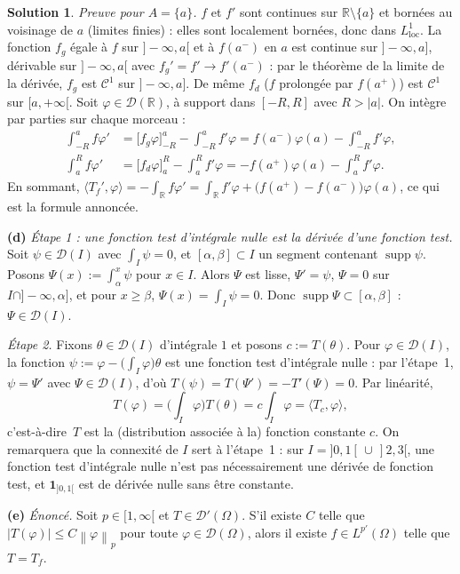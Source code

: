 \documentclass[11pt,a4paper]{article}
\newcommand{\R}{\mathbb{R}}
\newcommand{\norm}[1]{\left\|#1\right\|}
\newcommand{\ie}{c'est-à-dire}
\DeclareMathOperator{\supp}{supp}
\newcommand{\D}{\mathcal{D}}
\theoremstyle{definition}
\newtheorem*{solution}{Solution}
\begin{document}
\begin{solution}
\emph{Preuve pour $A=\{a\}$.} $f$ et $f'$ sont continues sur $\R\setminus\{a\}$ et bornées au voisinage de $a$ (limites finies) : elles sont localement bornées, donc dans $L^1_{\mathrm{loc}}$. La fonction $f_g$ égale à $f$ sur $]-\infty,a[$ et à $f(a^-)$ en $a$ est continue sur $]-\infty,a]$, dérivable sur $]-\infty,a[$ avec $f_g'=f'\to f'(a^-)$ : par le théorème de la limite de la dérivée, $f_g$ est $\mathcal C^1$ sur $]-\infty,a]$. De même $f_d$ ($f$ prolongée par $f(a^+)$) est $\mathcal C^1$ sur $[a,+\infty[$. Soit $\varphi\in\D(\R)$, à support dans $[-R,R]$ avec $R>|a|$. On intègre par parties sur chaque morceau :
\begin{align*}
\int_{-R}^af\varphi'&=\big[f_g\varphi\big]_{-R}^a-\int_{-R}^af'\varphi=f(a^-)\varphi(a)-\int_{-R}^af'\varphi,\\
\int_a^Rf\varphi'&=\big[f_d\varphi\big]_a^R-\int_a^Rf'\varphi=-f(a^+)\varphi(a)-\int_a^Rf'\varphi .
\end{align*}
En sommant, $\langle T_f',\varphi\rangle=-\int_\R f\varphi'=\int_\R f'\varphi+\big(f(a^+)-f(a^-)\big)\varphi(a)$, ce qui est la formule annoncée.

\medskip
\noindent\textbf{(d)} \emph{Étape 1 : une fonction test d'intégrale nulle est la dérivée d'une fonction test.} Soit $\psi\in\D(I)$ avec $\int_I\psi=0$, et $[\alpha,\beta]\subset I$ un segment contenant $\supp\psi$. Posons $\Psi(x):=\int_\alpha^x\psi$ pour $x\in I$. Alors $\Psi$ est lisse, $\Psi'=\psi$, $\Psi=0$ sur $I\cap]-\infty,\alpha]$, et pour $x\ge\beta$, $\Psi(x)=\int_I\psi=0$. Donc $\supp\Psi\subset[\alpha,\beta]$ : $\Psi\in\D(I)$.

\emph{Étape 2.} Fixons $\theta\in\D(I)$ d'intégrale $1$ et posons $c:=T(\theta)$. Pour $\varphi\in\D(I)$, la fonction $\psi:=\varphi-\big(\int_I\varphi\big)\theta$ est une fonction test d'intégrale nulle : par l'étape~1, $\psi=\Psi'$ avec $\Psi\in\D(I)$, d'où $T(\psi)=T(\Psi')=-T'(\Psi)=0$. Par linéarité,
\[
T(\varphi)=\Big(\int_I\varphi\Big)T(\theta)=c\int_I\varphi=\langle T_c,\varphi\rangle ,
\]
\ie\ $T$ est la (distribution associée à la) fonction constante $c$. On remarquera que la connexité de $I$ sert à l'étape~1 : sur $I=]0,1[\,\cup\,]2,3[$, une fonction test d'intégrale nulle n'est pas nécessairement une dérivée de fonction test, et $\mathbf 1_{]0,1[}$ est de dérivée nulle sans être constante.

\medskip
\noindent\textbf{(e)} \emph{Énoncé.} Soit $p\in[1,\infty[$ et $T\in\D'(\Omega)$. S'il existe $C$ telle que $|T(\varphi)|\le C\norm\varphi_p$ pour toute $\varphi\in\D(\Omega)$, alors il existe $f\in L^{p'}(\Omega)$ telle que $T=T_f$.


\end{solution}
\end{document}
